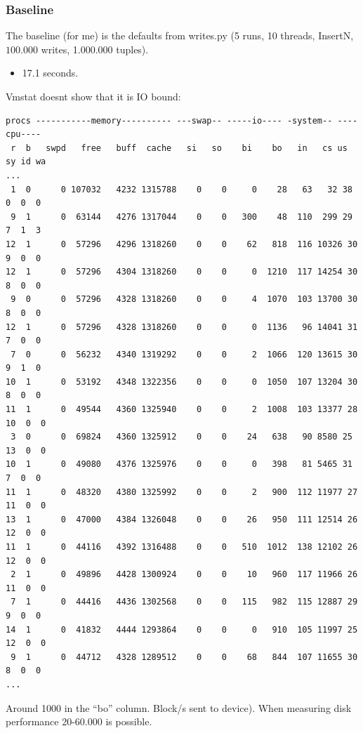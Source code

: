 \subsubsection{Baseline}
The baseline (for me) is the defaults from writes.py (5 runs, 10 threads,
InsertN,$100.000$ writes, 1.000.000 tuples). 
\begin{itemize}
  \item 17.1 seconds.
\end{itemize}
Vmstat doesnt show that it is IO bound:
\begin{verbatim}
procs -----------memory---------- ---swap-- -----io---- -system-- ----cpu----
 r  b   swpd   free   buff  cache   si   so    bi    bo   in   cs us sy id wa
...
 1  0      0 107032   4232 1315788    0    0     0    28   63   32 38  0  0  0
 9  1      0  63144   4276 1317044    0    0   300    48  110  299 29  7  1  3
12  1      0  57296   4296 1318260    0    0    62   818  116 10326 30  9  0  0
12  1      0  57296   4304 1318260    0    0     0  1210  117 14254 30  8  0  0
 9  0      0  57296   4328 1318260    0    0     4  1070  103 13700 30  8  0  0
12  1      0  57296   4328 1318260    0    0     0  1136   96 14041 31  7  0  0
 7  0      0  56232   4340 1319292    0    0     2  1066  120 13615 30  9  1  0
10  1      0  53192   4348 1322356    0    0     0  1050  107 13204 30  8  0  0
11  1      0  49544   4360 1325940    0    0     2  1008  103 13377 28 10  0  0
 3  0      0  69824   4360 1325912    0    0    24   638   90 8580 25 13  0  0
10  1      0  49080   4376 1325976    0    0     0   398   81 5465 31  7  0  0
11  1      0  48320   4380 1325992    0    0     2   900  112 11977 27 11  0  0
13  1      0  47000   4384 1326048    0    0    26   950  111 12514 26 12  0  0
11  1      0  44116   4392 1316488    0    0   510  1012  138 12102 26 12  0  0
 2  1      0  49896   4428 1300924    0    0    10   960  117 11966 26 11  0  0
 7  1      0  44416   4436 1302568    0    0   115   982  115 12887 29  9  0  0
14  1      0  41832   4444 1293864    0    0     0   910  105 11997 25 12  0  0
 9  1      0  44712   4328 1289512    0    0    68   844  107 11655 30  8  0  0
...
\end{verbatim}
Around 1000 in the ``bo'' column. Block/s sent to device). 
When measuring disk performance 20-60.000 is possible.

